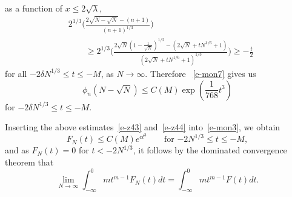 \documentclass{amsart}
\theoremstyle{definition}
\theoremstyle{remark}
\numberwithin{equation}{section}
\begin{document}
as a function of $x\le 2\sqrt{\lambda}$,
\begin{equation*}\label{e-mon8}
 \begin{split}
    &2^{1/3}\biggl(\frac{2\sqrt{N-\sqrt{N}}-(n+1)}{(n+1)^{1/3}}\biggr)\\
    &\qquad \geq 2^{1/3}\biggl(
\frac{2\sqrt{N}(1-\frac1{\sqrt{N}})^{1/2}-(2\sqrt{N}+tN^{1/6}+1)}
{(2\sqrt{N}+tN^{1/6}+1)^{1/3}}\biggr)
\geq -\frac{t}2
 \end{split}
\end{equation*}
for all $-2\delta N^{1/3}\le t\le -M$, as $N\to\infty$.
Therefore ~\eqref{e-mon7} gives us
\begin{equation}\label{e-z44}
    \phi_n(N-\sqrt{N})\le C(M) \exp(\frac1{768}t^3)
\end{equation}
for $-2\delta N^{1/3}\le t\le -M$.

Inserting the above estimates~\eqref{e-z43} and~\eqref{e-z44} 
into~\eqref{e-mon3}, 
we obtain 
\begin{equation}\label{e-z45}
    F_N(t)\le C(M)e^{ct^3}\qquad\text{for $-2N^{1/3}\le t\le -M$}, 
\end{equation}
and as $F_N(t)=0$ for $t< -2N^{1/3}$, it follows by the 
dominated convergence theorem that 
\begin{equation}
   \lim_{N\to\infty} \int_{-\infty}^{0} mt^{m-1}F_N(t) dt
=\int_{-\infty}^{0} mt^{m-1}F(t) dt.
\end{equation}
\end{document}
